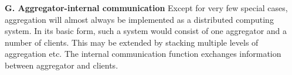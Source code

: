 \textbf{G. Aggregator-internal communication}
Except for very few special cases, aggregation will almost always be implemented as a distributed computing system. In its basic form, such a system would consist of one aggregator and a number of clients. This may be extended by stacking multiple levels of aggregation etc. The internal communication function exchanges information between aggregator and clients.
